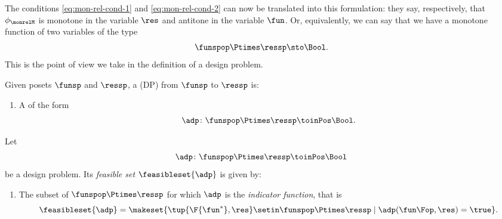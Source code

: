 The conditions \cref{eq:mon-rel-cond-1} and \cref{eq:mon-rel-cond-2} can now be translated into this formulation: they say, respectively, that $\phi_\monrelM$ is monotone in the variable $\res$ and antitone in the variable $\fun$.
Or, equivalently, we can say that we have a monotone function of two variables of the type
\begin{equation}
    \funspop \Ptimes \ressp \sto \Bool.
\end{equation}
This is the point of view we take in the definition of a design problem.




\begin{definition}
    \label{def:design-problem}
    Given posets $\funsp$ and $\ressp$, a  (DP) from $\funsp$ to $\ressp$ is:

    \constit
    \begin{enumerate}
        \item A  of the form
              \begin{equation}
                  \label{eq:design_prob_as_monfun}
                  \adp \colon \funspop \Ptimes \ressp \toinPos \Bool.
              \end{equation}
    \end{enumerate}
\end{definition}

\begin{definition}
    \label{def:dp-feasible-set}
    Let
    \begin{equation}
        \label{eq:generic-design-prob}
        \adp\colon \funspop \Ptimes \ressp \toinPos \Bool
    \end{equation}
    be a design problem. Its \emph{feasible set} $\feasibleset{\adp}$ is given by:

    \constit
    \begin{enumerate}
        \item The subset of $\funspop\Ptimes \ressp$ for which $\adp$ is the \emph{indicator function}, that is
              \begin{equation}
                  \label{eq:design-prob-as-upper-set}
                  \feasibleset{\adp} = \makeset{ \tup{\F{\fun^*},\res} \setin \funspop\Ptimes \ressp \mid %
                      \adp(\fun\Fop, \res) = \true %
                  }.
              \end{equation}
    \end{enumerate}
\end{definition}


